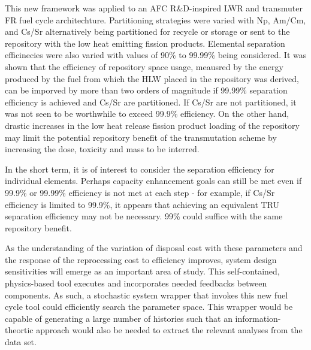 This new framework was applied to an AFC R\&D-inspired LWR and transmuter 
FR fuel cycle architechture.  Partitioning strategies were varied with 
Np, Am/Cm, and Cs/Sr alternatively being partitioned for recycle or storage 
or sent to the repository with the low heat emitting fission products.
Elemental separation efficinecies were also varied with values of
90\% to 99.99\% being considered.  It was shown that the efficiency 
of repository space usage, meausred by the energy produced by the fuel from
which the HLW placed in the repository was derived, can be imporved by 
more than two orders of magnitude if 99.99\% separation efficiency is 
achieved and Cs/Sr are partitioned.  If Cs/Sr are not partitioned, it was not seen
to be worthwhile to exceed 99.9\% efficiency.  On the other hand,
drastic increases in the low heat release fission product loading of the
repository may limit the potential repository benefit of the
transmutation scheme by increasing the dose, toxicity and mass to be
interred.

In the short term, it is of interest to consider the separation
efficiency for individual elements.  Perhaps capacity enhancement goals
can still be met even if 99.9\% or 99.99\% efficiency is not met at each
step - for example, if Cs/Sr efficiency is limited to 99.9\%, it
appears that achieving an equivalent TRU separation efficiency may not
be necessary. 99\% could suffice with the same repository benefit.  

As the understanding of the variation of disposal cost with
these parameters and the response of the reprocessing cost to
efficiency improves, system design sensitivities will emerge as an important
area of study.  This self-contained, physics-based tool executes and
incorporates needed feedbacks between components.  As such, a stochastic
system wrapper that invokes this new fuel cycle tool could efficiently
search the parameter space.  This wrapper would be capable of generating 
a large number of histories such that an information-theortic approach 
would also be needed to extract the relevant analyses from the data set.

